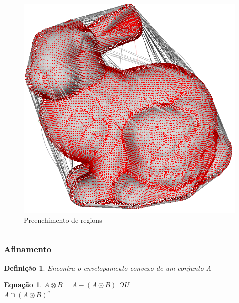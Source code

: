 \documentclass[aspectratio=169]{beamer}
\theoremstyle{Definition}
\newtheorem{defn}{Defini\c c\~ao}
\newtheorem{eq}[theorem]{Equa\c c\~ao}
\begin{document}
\begin{frame}
\begin{columns}
\begin{column}{0.5\textwidth}
\begin{figure}[h]
			   	\includegraphics[height=0.15\paperheight]{imagens/convex_hull2}
				\caption{Preenchimento de regions}\label{figLogical}
			\end{figure}
		\end{column}
	\end{columns}
	
\end{frame}


\begin{frame}
	\frametitle{Afinamento}
	
	\begin{defn}
		Encontra o envelopamento convexo de um conjunto A
	\end{defn}
	
	\begin{eq}
	$ A \otimes B = A - (A \circledast B)$  OU\\
	$ A\cap (A \circledast B)^c$

	\end{eq}
	
	
\end{frame}
\end{document}
